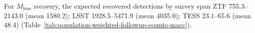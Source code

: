 For $M_\mathrm{lens}$ recovery, the expected recovered detections by survey span ZTF 755.3--2143.0 (mean 1580.2); LSST 1928.5--5471.9 (mean 4035.0); TESS 23.1--65.6 (mean 48.4) (Table~\ref{tab:population-weighted-followup-counts-macc}).
